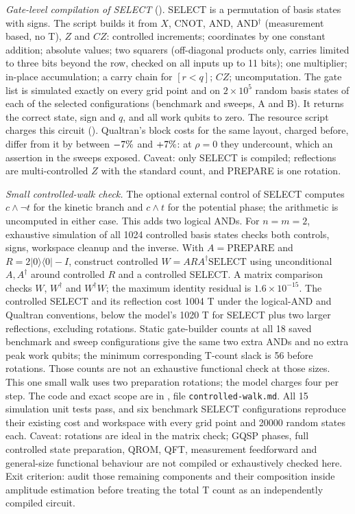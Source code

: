 \documentclass[11pt,a4paper]{article}
\begin{document}
\emph{Gate-level compilation of SELECT} (). SELECT is a permutation of basis states
with signs. The script builds it from $X$, CNOT, AND, AND$^\dagger$ (measurement based, no T), $Z$ and $CZ$: controlled
increments; coordinates by one constant addition; absolute values; two squarers (off-diagonal products only, carries
limited to three bits beyond the row, checked on all inputs up to 11 bits); one multiplier; in-place accumulation;
a carry chain for $[r<q]$; $CZ$; uncomputation. The gate list is simulated exactly on every grid point and on
$2\times10^5$ random basis states of each of the \CompileCount{} selected configurations (benchmark and sweeps, A and
B). It returns the correct state, sign and $q$, and all work qubits to zero. The resource script charges this
circuit (). Qualtran's block costs for the same layout, charged before, differ from it by
between $-7\%$ and $+7\%$: at $\rho=0$ they undercount, which an assertion in the sweeps exposed. Caveat: only
SELECT is compiled; reflections are multi-controlled $Z$ with the standard count, and PREPARE is one rotation.

\emph{Small controlled-walk check.} The optional external control of SELECT
computes $c\wedge\neg t$ for the kinetic branch and $c\wedge t$ for the
potential phase; the arithmetic is uncomputed in either case. This adds two
logical ANDs. For $n=m=2$, exhaustive simulation of all 1024 controlled basis
states checks both controls, signs, workspace cleanup and the inverse. With
$A=\mathrm{PREPARE}$ and $R=2|0\rangle\langle0|-I$, construct controlled
$W=A R A^\dagger\mathrm{SELECT}$ using unconditional $A,A^\dagger$ around
controlled $R$ and a controlled SELECT. A matrix comparison checks $W$,
$W^\dagger$ and $W^\dagger W$; the maximum identity residual is
$1.6\times10^{-15}$. The controlled SELECT and its reflection cost 1004 T
under the logical-AND and Qualtran conventions, below the model's 1020 T
for SELECT plus two larger reflections, excluding rotations. Static gate-builder
counts at all 18 saved benchmark and sweep configurations give the same two
extra ANDs and no extra peak work qubits; the minimum corresponding T-count
slack is 56 before rotations. Those counts are not an exhaustive functional
check at those sizes. This one small walk uses two preparation rotations; the
model charges four per step. The
code and exact scope are in , file
\texttt{controlled-walk.md}. All 15 simulation unit tests pass, and six
benchmark SELECT configurations reproduce their existing cost and workspace
with every grid point and 20000 random states each. Caveat: rotations are
ideal in the matrix check; GQSP phases, full controlled state preparation,
QROM, QFT, measurement feedforward and general-size functional behaviour are
not compiled or exhaustively checked here. Exit criterion: audit those remaining components and their
composition inside amplitude estimation before treating the total T count as
an independently compiled circuit.
\end{document}
